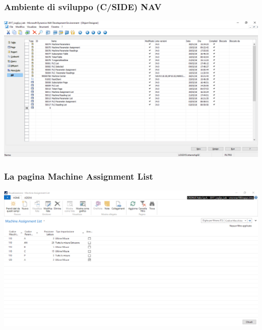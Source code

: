 \documentclass{beamer}
\begin{document}
\begin{frame}
\frametitle{Ambiente di sviluppo (C/SIDE) NAV}
\includegraphics[width=1\textwidth]{images/NAVDevelopmentEnvironment.png}
\end{frame}





\begin{frame}
\frametitle{La pagina Machine Assignment List}
\includegraphics[width=1\textwidth]{images/MachineAssignmentList2.png}
\end{frame}


\end{document}
